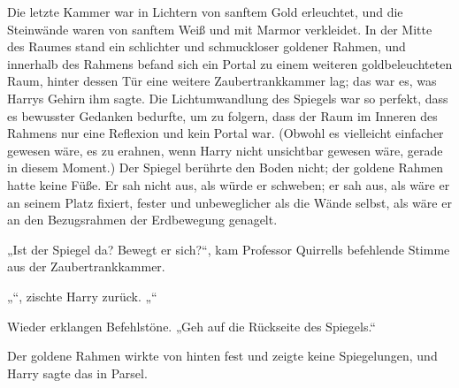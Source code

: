 Die letzte Kammer war in Lichtern von sanftem Gold erleuchtet, und die Steinwände waren von sanftem Weiß und mit Marmor verkleidet.
In der Mitte des Raumes stand ein schlichter und schmuckloser goldener Rahmen, und innerhalb des Rahmens befand sich ein Portal zu einem weiteren goldbeleuchteten Raum, hinter dessen Tür eine weitere Zaubertrankkammer lag; das war es, was Harrys Gehirn ihm sagte. Die Lichtumwandlung des Spiegels war so perfekt, dass es bewusster Gedanken bedurfte, um zu folgern, dass der Raum im Inneren des Rahmens nur eine Reflexion und kein Portal war. (Obwohl es vielleicht einfacher gewesen wäre, es zu erahnen, wenn Harry nicht unsichtbar gewesen wäre, gerade in diesem Moment.)
Der Spiegel berührte den Boden nicht; der goldene Rahmen hatte keine Füße. Er sah nicht aus, als würde er schweben; er sah aus, als wäre er an seinem Platz fixiert, fester und unbeweglicher als die Wände selbst, als wäre er an den Bezugsrahmen der Erdbewegung genagelt.

„Ist der Spiegel da? Bewegt er sich?“, kam Professor Quirrells befehlende Stimme aus der Zaubertrankkammer.

„“, zischte Harry zurück. „“

Wieder erklangen Befehlstöne. „Geh auf die Rückseite des Spiegels.“

Der goldene Rahmen wirkte von hinten fest und zeigte keine Spiegelungen, und Harry sagte das in Parsel.

